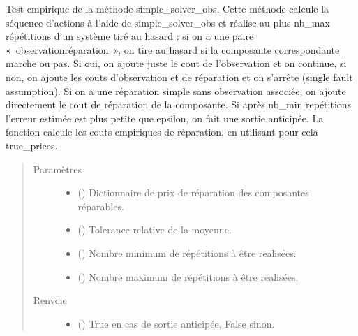 \documentclass[letterpaper,10pt,french]{sphinxmanual}
\begin{document}
\begin{fulllineitems}
\begin{fulllineitems}
\label{\detokenize{index:DecisionTheoreticTroubleshooting.TroubleShootingProblem.simple_solver_obs_tester}}
Test empirique de la méthode simple\_solver\_obs. Cette méthode calcule
la séquence d’actions à l’aide de simple\_solver\_obs et réalise au plus
nb\_max répétitions d’un système tiré au hasard : si on a une paire
« observation\sphinxhyphen{}réparation », on tire au hasard si la composante
correspondante marche ou pas. Si oui, on ajoute juste le cout de
l’observation et on continue, si non, on ajoute les couts d’observation
et de réparation et on s’arrête (single fault assumption). Si on a
une réparation simple sans observation associée, on ajoute directement
le cout de réparation de la composante. Si après nb\_min repétitions
l’erreur estimée est plus petite que epsilon, on fait une sortie
anticipée. La fonction calcule les couts empiriques de réparation, en
utilisant pour cela true\_prices.
\begin{quote}\begin{description}
\item[{Paramètres}] \leavevmode\begin{itemize}
\item {} 
 () \textendash{} Dictionnaire de prix de réparation des composantes réparables.

\item {} 
 () \textendash{} Tolerance relative de la moyenne.

\item {} 
 () \textendash{} Nombre minimum de répétitions à être realisées.

\item {} 
 () \textendash{} Nombre maximum de répétitions à être realisées.

\end{itemize}

\item[{Renvoie}] \leavevmode
\begin{itemize}
\item {} 
 () \textendash{} True en cas de sortie anticipée, False sinon.


\end{itemize}
\end{description}
\end{quote}
\end{fulllineitems}
\end{fulllineitems}
\end{document}
